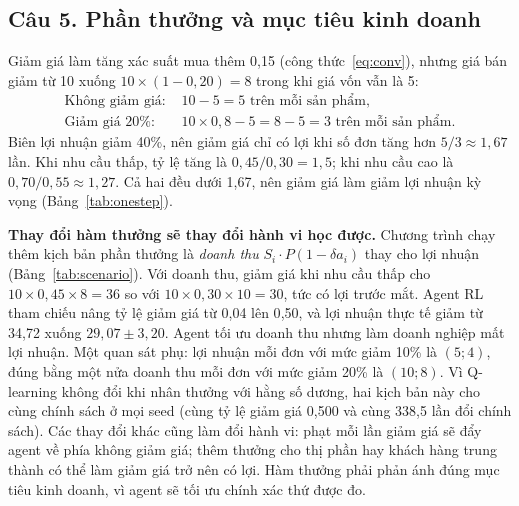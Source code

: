 \documentclass[12pt,a4paper]{report}
\begin{document}
\subsection*{Câu 5. Phần thưởng và mục tiêu kinh doanh}
Giảm giá làm tăng xác suất mua thêm 0{,}15 (công thức~\eqref{eq:conv}), nhưng giá
bán giảm từ 10 xuống $10\times(1-0{,}20)=8$ trong khi giá vốn vẫn là 5:
\begin{align*}
\text{Không giảm giá: } & 10-5=5 \text{ trên mỗi sản phẩm},\\
\text{Giảm giá 20\%: } & 10\times0{,}8-5=8-5=3 \text{ trên mỗi sản phẩm}.
\end{align*}
Biên lợi nhuận giảm 40\%, nên giảm giá chỉ có lợi khi số đơn tăng hơn
$5/3\approx1{,}67$ lần. Khi nhu cầu thấp, tỷ lệ tăng là $0{,}45/0{,}30=1{,}5$; khi
nhu cầu cao là $0{,}70/0{,}55\approx1{,}27$. Cả hai đều dưới 1{,}67, nên giảm giá
làm giảm lợi nhuận kỳ vọng (Bảng~\ref{tab:onestep}).

\textbf{Thay đổi hàm thưởng sẽ thay đổi hành vi học được.} Chương trình chạy thêm
kịch bản phần thưởng là \emph{doanh thu} $S_i\cdot P(1-\delta a_i)$ thay cho lợi
nhuận (Bảng~\ref{tab:scenario}). Với doanh thu, giảm giá khi nhu cầu thấp cho
$10\times0{,}45\times8=36$ so với $10\times0{,}30\times10=30$, tức có lợi trước mắt.
Agent RL tham chiếu nâng tỷ lệ giảm giá từ 0{,}04 lên 0{,}50, và lợi nhuận thực tế
giảm từ 34{,}72 xuống $29{,}07\pm3{,}20$. Agent tối ưu doanh thu nhưng làm doanh
nghiệp mất lợi nhuận. Một quan sát phụ: lợi nhuận mỗi đơn với mức giảm 10\% là
$(5;4)$, đúng bằng một nửa doanh thu mỗi đơn với mức giảm 20\% là $(10;8)$. Vì
Q-learning không đổi khi nhân thưởng với hằng số dương, hai kịch bản này cho cùng
chính sách ở mọi seed (cùng tỷ lệ giảm giá 0{,}500 và cùng 338{,}5 lần đổi chính
sách). Các thay đổi khác cũng làm đổi hành vi: phạt mỗi lần giảm giá sẽ đẩy agent
về phía không giảm giá; thêm thưởng cho thị phần hay khách hàng trung thành có thể
làm giảm giá trở nên có lợi. Hàm thưởng phải phản ánh đúng mục tiêu kinh doanh, vì
agent sẽ tối ưu chính xác thứ được đo.

\end{document}
